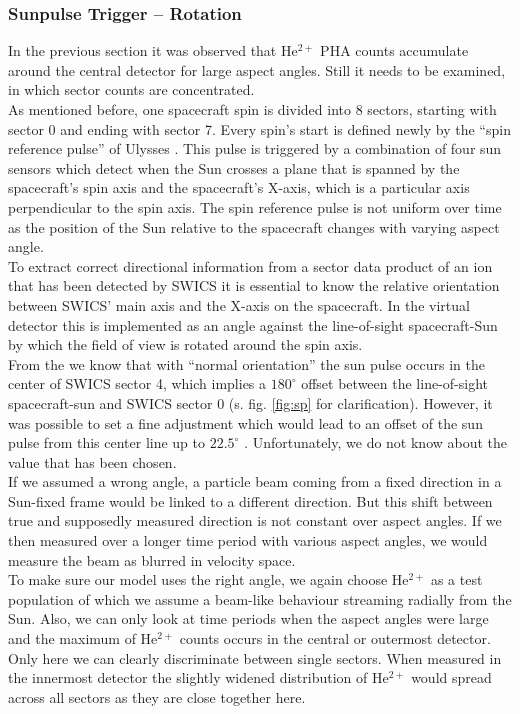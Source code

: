 \subsubsection{Sunpulse Trigger -- Rotation}
In the previous section it was observed that $\mathrm{He^{2+}}$ PHA counts accumulate around the central detector for large aspect angles. Still it needs to be examined, in which sector counts are concentrated.\\
As mentioned before, one spacecraft spin is divided into 8 sectors, starting with sector 0 and ending with sector 7. Every spin's start is defined newly by the ``spin reference pulse'' of Ulysses \citep{hiscale}. This pulse is triggered by a combination of four sun sensors which detect when the Sun crosses a plane that is spanned by the spacecraft's spin axis and the spacecraft's X-axis, which is a particular axis perpendicular to the spin axis. The spin reference pulse is not uniform over time as the position of the Sun relative to the spacecraft changes with varying aspect angle.\\
To extract correct directional information from a sector data product of an ion that has been detected by SWICS it is essential to know the relative orientation between SWICS' main axis and the X-axis on the spacecraft. In the virtual detector this is implemented as an angle against the line-of-sight spacecraft-Sun by which the field of view is rotated around the spin axis.\\
From the \citet[][S.20-22]{swics_dpu} we know that with ``normal orientation'' the sun pulse occurs in the center of SWICS sector 4, which implies a $180^\circ$ offset between the line-of-sight spacecraft-sun and SWICS sector 0 (s. fig. \ref{fig:sp} for clarification). However, it was possible to set a fine adjustment which would lead to an offset of the sun pulse from this center line up to $22.5^\circ$ \citet[][S.48]{swics_dpu}. Unfortunately, we do not know about the value that has been chosen.
\\
If we assumed a wrong angle, a particle beam coming from a fixed direction in a Sun-fixed frame would be linked to a different direction. But this shift between true and supposedly measured direction is not constant over aspect angles. If we then measured over a longer time period with various aspect angles, we would measure the beam as blurred in velocity space.
\\
To make sure our model uses the right angle, we again choose $\mathrm{He^{2+}}$ as a test population of which we assume a beam-like behaviour streaming radially from the Sun. Also, we can only look at time periods when the aspect angles were large and the maximum of $\mathrm{He^{2+}}$ counts occurs in the central or outermost detector. Only here we can clearly discriminate between single sectors. When measured in the innermost detector the slightly widened distribution of $\mathrm{He^{2+}}$ would spread across all sectors as they are close together here.
